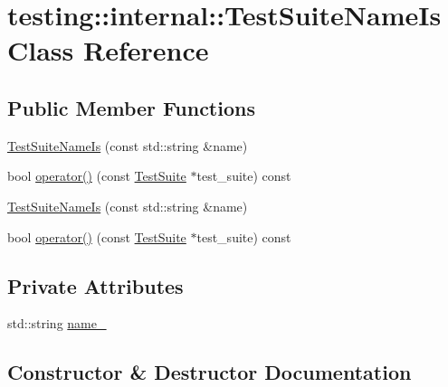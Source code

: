 \hypertarget{classtesting_1_1internal_1_1_test_suite_name_is}{}\section{testing\+::internal\+::Test\+Suite\+Name\+Is Class Reference}
\label{classtesting_1_1internal_1_1_test_suite_name_is}
\subsection*{Public Member Functions}
\begin{DoxyCompactItemize}
\item 
\mbox{\hyperlink{classtesting_1_1internal_1_1_test_suite_name_is_a7d65a4c117c222adb5512fe09329964f}{Test\+Suite\+Name\+Is}} (const std\+::string \&name)
\item 
bool \mbox{\hyperlink{classtesting_1_1internal_1_1_test_suite_name_is_a28ea67af3de2c5baf0fb70bfdd0784c6}{operator()}} (const \mbox{\hyperlink{classtesting_1_1_test_suite}{Test\+Suite}} $\ast$test\+\_\+suite) const
\item 
\mbox{\hyperlink{classtesting_1_1internal_1_1_test_suite_name_is_a7d65a4c117c222adb5512fe09329964f}{Test\+Suite\+Name\+Is}} (const std\+::string \&name)
\item 
bool \mbox{\hyperlink{classtesting_1_1internal_1_1_test_suite_name_is_a28ea67af3de2c5baf0fb70bfdd0784c6}{operator()}} (const \mbox{\hyperlink{classtesting_1_1_test_suite}{Test\+Suite}} $\ast$test\+\_\+suite) const
\end{DoxyCompactItemize}
\subsection*{Private Attributes}
\begin{DoxyCompactItemize}
\item 
std\+::string \mbox{\hyperlink{classtesting_1_1internal_1_1_test_suite_name_is_a55f64598a1bf6a95a376d732075e412e}{name\+\_\+}}
\end{DoxyCompactItemize}


\subsection{Constructor \& Destructor Documentation}
\mbox{\label{classtesting_1_1internal_1_1_test_suite_name_is_a7d65a4c117c222adb5512fe09329964f}} 
